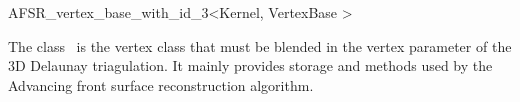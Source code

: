 \begin{ccRefClass}{AFSR_vertex_base_with_id_3<Kernel, VertexBase >}

\ccDefinition
  
The class \ccRefName\ is the vertex class that must be blended in the vertex parameter
of the 3D Delaunay triagulation. It mainly provides storage and methods used by the
Advancing front surface reconstruction algorithm.






{}


\ccOperations




\end{ccRefClass}
